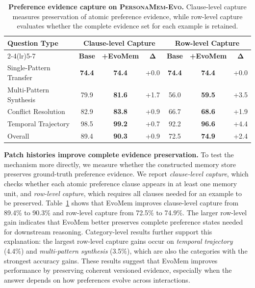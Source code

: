 \documentclass{article}
\begin{document}
\begin{table}[t]
  \centering
\caption{
\textbf{\small Preference evidence capture on \textsc{PersonaMem-Evo}.}
Clause-level capture measures preservation of atomic preference evidence, while row-level capture evaluates whether the complete evidence set for each example is retained.
}
  \setlength{\tabcolsep}{5pt}
  \begin{tabular}{lcccccc}
  \toprule
  \multirow{2}{*}{\textbf{Question Type}}
  & \multicolumn{3}{c}{\textbf{Clause-level Capture}}
  & \multicolumn{3}{c}{\textbf{Row-level Capture}} \\
  \cmidrule(lr){2-4}\cmidrule(lr){5-7}
  & \textbf{Base} & \textbf{+EvoMem} & $\boldsymbol{\Delta}$
  & \textbf{Base} & \textbf{+EvoMem} & $\boldsymbol{\Delta}$ \\
  \midrule
  Single-Pattern Transfer & \textbf{74.4} & \textbf{74.4} & +0.0 & \textbf{74.4} & \textbf{74.4} & +0.0 \\
  Multi-Pattern Synthesis & 79.9 & \textbf{81.6} & \textcolor{green!50!black}{+1.7} & 56.0 & \textbf{59.5} & \textcolor{green!50!black}{+3.5} \\
  Conflict Resolution & 82.9 & \textbf{83.8} & \textcolor{green!50!black}{+0.9} & 66.7 & \textbf{68.6} & \textcolor{green!50!black}{+1.9} \\
  Temporal Trajectory & 98.5 & \textbf{99.2} & \textcolor{green!50!black}{+0.7} & 92.2 & \textbf{96.6} & \textcolor{green!50!black}{+4.4} \\
  \midrule
\rowcolor{blue!8}
  Overall & 89.4 & \textbf{90.3} & \textcolor{green!50!black}{+0.9} & 72.5 & \textbf{74.9} & \textcolor{green!50!black}{+2.4} \\
  \bottomrule
  \end{tabular}
  \vspace{-2mm}
  \label{tab:persona_capture_by_ood}
\end{table}



\textbf{Patch histories improve complete evidence preservation.} \quad
To test the mechanism more directly, we measure whether the constructed memory store preserves ground-truth preference evidence. We report \emph{clause-level capture}, which checks whether each atomic preference clause appears in at least one memory unit, and \emph{row-level capture}, which requires all clauses needed for an example to be preserved. Table~\ref{tab:persona_capture_by_ood} shows that EvoMem improves clause-level capture from 89.4\% to 90.3\% and row-level capture from 72.5\% to 74.9\%. The larger row-level gain indicates that EvoMem better preserves complete preference states needed for downstream reasoning. Category-level results further support this explanation: the largest row-level capture gains occur on \emph{temporal trajectory} (4.4\%) and \emph{multi-pattern synthesis} (3.5\%), which are also the categories with the strongest accuracy gains. These results suggest that EvoMem improves performance by preserving coherent versioned evidence, especially when the answer depends on how preferences evolve across interactions.
\end{document}
